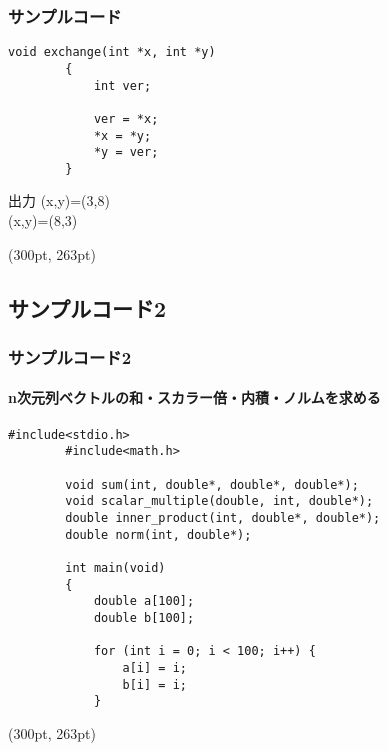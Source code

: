 \documentclass[dvipdfmx]{beamer}
\begin{document}
\begin{frame}[t, fragile]
    \frametitle{サンプルコード}
    \begin{lstlisting}[gobble=8, caption=pra\_pointer.c, firstnumber=16]
        void exchange(int *x, int *y)
        {
            int ver;

            ver = *x;
            *x = *y;
            *y = ver;
        }
    \end{lstlisting}
    \begin{block}{出力}
        (x,y)=(3,8)\\
        (x,y)=(8,3)
    \end{block}
    \begin{textblock*}{0.3\linewidth}(300pt, 263pt)
        \space
    \end{textblock*}
\end{frame}

\subsection{サンプルコード2}
\begin{frame}[t, fragile]
    \frametitle{サンプルコード2}
    \framesubtitle{\textrm{n}次元列ベクトルの和・スカラー倍・内積・ノルムを求める}
    \begin{lstlisting}[gobble= 8, caption=pra\_pointer.c]
        #include<stdio.h>
        #include<math.h>

        void sum(int, double*, double*, double*);
        void scalar_multiple(double, int, double*);
        double inner_product(int, double*, double*);
        double norm(int, double*);

        int main(void)
        {
            double a[100];
            double b[100];
            
            for (int i = 0; i < 100; i++) {
                a[i] = i;
                b[i] = i;
            }
    \end{lstlisting}
    \begin{textblock*}{0.3\linewidth}(300pt, 263pt)
        \space
    \end{textblock*}
\end{frame}
\end{document}
